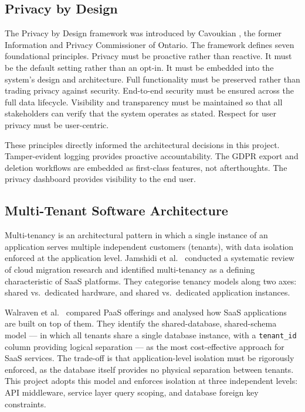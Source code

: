 \documentclass[a4paper,12pt,onecolumn]{report}
\begin{document}
\subsection{Privacy by Design}

The Privacy by Design framework was introduced by Cavoukian \cite{cavoukian2009}, the former Information and Privacy Commissioner of Ontario.
The framework defines seven foundational principles.
Privacy must be proactive rather than reactive.
It must be the default setting rather than an opt-in.
It must be embedded into the system's design and architecture.
Full functionality must be preserved rather than trading privacy against security.
End-to-end security must be ensured across the full data lifecycle.
Visibility and transparency must be maintained so that all stakeholders can verify that the system operates as stated.
Respect for user privacy must be user-centric.

These principles directly informed the architectural decisions in this project.
Tamper-evident logging provides proactive accountability.
The GDPR export and deletion workflows are embedded as first-class features, not afterthoughts.
The privacy dashboard provides visibility to the end user.

\subsection{Multi-Tenant Software Architecture}

Multi-tenancy is an architectural pattern in which a single instance of an application serves multiple independent customers (tenants), with data isolation enforced at the application level.
Jamshidi et al.\ \cite{multitenant} conducted a systematic review of cloud migration research and identified multi-tenancy as a defining characteristic of SaaS platforms.
They categorise tenancy models along two axes: shared vs.\ dedicated hardware, and shared vs.\ dedicated application instances.

Walraven et al.\ \cite{walraven2011} compared PaaS offerings and analysed how SaaS applications are built on top of them.
They identify the shared-database, shared-schema model --- in which all tenants share a single database instance, with a \texttt{tenant\_id} column providing logical separation --- as the most cost-effective approach for SaaS services.
The trade-off is that application-level isolation must be rigorously enforced, as the database itself provides no physical separation between tenants.
This project adopts this model and enforces isolation at three independent levels: API middleware, service layer query scoping, and database foreign key constraints.
\end{document}

